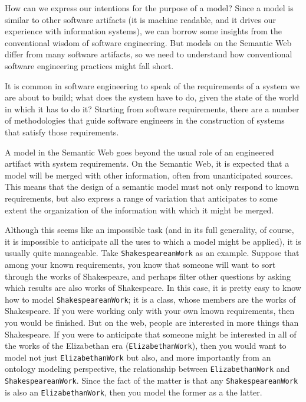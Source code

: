 How can we express our intentions for the purpose of a model?  Since a model
is similar to other software artifacts (it is machine readable, and it drives our 
experience with information systems), we can borrow some insights from the conventional
wisdom of software engineering.  But models on the Semantic Web differ from many
software artifacts, so we need to understand how conventional software 
engineering practices
might fall short.

It is common in software engineering to speak of the 
requirements of a system we are about to build; what does the system have to 
do, given the state of the world in which it has to do it?  Starting from 
software requirements, there are a number of methodologies that guide software 
engineers in the construction of systems that satisfy those requirements. 

A model in the
Semantic Web goes beyond the usual role of an engineered artifact with
system requirements. On the Semantic Web, it is expected that a model
will be merged with other information, often from unanticipated sources.
This means that the design of a semantic model must not only respond to
known requirements, but also
express a range of variation that anticipates to some extent the
organization of the information with which it might be merged.

Although this seems like an impossible task (and in its full generality,
of course, it is
impossible to anticipate all the uses to which a model might be
applied), it is usually quite manageable. Take \texttt{ShakespeareanWork}
as an example.  Suppose that among your known requirements, you know that 
someone will want to sort through the works of Shakespeare, and perhaps
filter other questions by asking which results are also works of Shakespeare. 
In this case, it is pretty easy to know how to model \texttt{ShakespeareanWork}; it 
is a class, whose members are the works of Shakespeare. 
If you were working only with your own known requirements, then you would be
finished.  But on the web, people are interested in more things than Shakespeare.
If you were to anticipate that someone might be interested in all of the works
of the Elizabethan era (\texttt{ElizabethanWork}), then you would want to model not just
\texttt{ElizabethanWork} but also, and more importantly from an ontology modeling 
perspective, the relationship between \texttt{ElizabethanWork} and \texttt{ShakespeareanWork}.  Since the fact of the matter is that any \texttt{ShakespeareanWork} is also an \texttt{ElizabethanWork}, then you model the former as a  the latter. 

